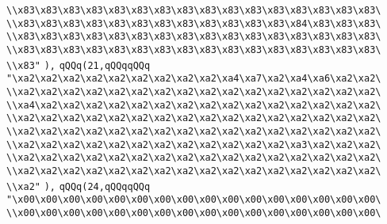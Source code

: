 \verb|\\x83\x83\x83\x83\x83\x83\x83\x83\x83\x83\x83\x83\x83\x83\x83\x83\|\newline
\verb|\\x83\x83\x83\x83\x83\x83\x83\x83\x83\x83\x83\x83\x84\x83\x83\x83\|\newline
\verb|\\x83\x83\x83\x83\x83\x83\x83\x83\x83\x83\x83\x83\x83\x83\x83\x83\|\newline
\verb|\\x83\x83\x83\x83\x83\x83\x83\x83\x83\x83\x83\x83\x83\x83\x83\x83\|\newline
\verb|\\x83"|\newline
\verb|),|\newline
\verb|qQQq(21,qQQqqQQq|\newline
\verb|"\xa2\xa2\xa2\xa2\xa2\xa2\xa2\xa2\xa2\xa4\xa7\xa2\xa4\xa6\xa2\xa2\|\newline
\verb|\\xa2\xa2\xa2\xa2\xa2\xa2\xa2\xa2\xa2\xa2\xa2\xa2\xa2\xa2\xa2\xa2\|\newline
\verb|\\xa4\xa2\xa2\xa2\xa2\xa2\xa2\xa2\xa2\xa2\xa2\xa2\xa2\xa2\xa2\xa2\|\newline
\verb|\\xa2\xa2\xa2\xa2\xa2\xa2\xa2\xa2\xa2\xa2\xa2\xa2\xa2\xa2\xa2\xa2\|\newline
\verb|\\xa2\xa2\xa2\xa2\xa2\xa2\xa2\xa2\xa2\xa2\xa2\xa2\xa2\xa2\xa2\xa2\|\newline
\verb|\\xa2\xa2\xa2\xa2\xa2\xa2\xa2\xa2\xa2\xa2\xa2\xa2\xa3\xa2\xa2\xa2\|\newline
\verb|\\xa2\xa2\xa2\xa2\xa2\xa2\xa2\xa2\xa2\xa2\xa2\xa2\xa2\xa2\xa2\xa2\|\newline
\verb|\\xa2\xa2\xa2\xa2\xa2\xa2\xa2\xa2\xa2\xa2\xa2\xa2\xa2\xa2\xa2\xa2\|\newline
\verb|\\xa2"|\newline
\verb|),|\newline
\verb|qQQq(24,qQQqqQQq|\newline
\verb|"\x00\x00\x00\x00\x00\x00\x00\x00\x00\x00\x00\x00\x00\x00\x00\x00\|\newline
\verb|\\x00\x00\x00\x00\x00\x00\x00\x00\x00\x00\x00\x00\x00\x00\x00\x00\|\newline
